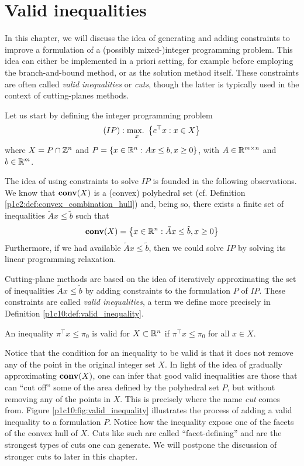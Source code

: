 \section{Valid inequalities}

In this chapter, we will discuss the idea of generating and adding constraints to improve a formulation of a (possibly mixed-)integer programming problem. This idea can either be implemented in a priori setting, for example before employing the branch-and-bound method, or as the solution method itself. These constraints are often called \emph{valid inequalities} or \emph{cuts}, though the latter is typically used in the context of cutting-planes methods.

Let us start by defining the integer programming problem
%
\begin{equation*}
	(IP) : \mathop{\text{max.~}}_x \left\{ c^\top x : x \in X \right \}
\end{equation*}
%
where $X = P \cap \mathbb{Z}^n$ and $P = \left\{ x \in \mathbb{R}^n : Ax \leq b, x \geq 0 \right \}$, with $A \in \mathbb{R}^{m \times n}$ and $b \in \mathbb{R}^m$. 

The idea of using constraints to solve $IP$ is founded in the following observations. We know that $\mathop{\bf conv}(X)$ is a (convex) polyhedral set (cf. Definition \ref{p1c2:def:convex_combination_hull}) and, being so, there exists a finite set of inequalities $\tilde{A}x \le \tilde{b}$ such that 
%
\begin{equation*}
	\mathop{\bf conv}(X) = \left\{ x \in \mathbb{R}^n: \tilde{A}x \leq \tilde{b}, x \geq 0 \right \}	
\end{equation*}
%
Furthermore, if we had available $\tilde{A}x \le \tilde{b}$, then we could solve $IP$ by solving its linear programming relaxation.

Cutting-plane methods are based on the idea of iteratively approximating the set of inequalities $\tilde{A}x \le \tilde{b}$ by adding constraints to the formulation $P$ of $IP$. These constraints are called \emph{valid inequalities}, a term we define more precisely in Definition \ref{p1c10:def:valid_inequality}.

\begin{definition} \label{p1c10:def:valid_inequality}
	An inequality $\pi^\top  x \leq \pi_0$ is valid for $X \subset \mathbb{R}^n$ if $\pi^\top  x \leq \pi_0$ for all $x \in X$.
\end{definition}

Notice that the condition for an inequality to be valid is that it does not remove any of the point in the original integer set $X$. In light of the idea of gradually approximating $\mathop{\bf conv}(X)$, one can infer that good valid inequalities are those that can ``cut off'' some of the area defined by the polyhedral set $P$, but without removing any of the points in $X$. This is precisely where the name \emph{cut} comes from. Figure \ref{p1c10:fig:valid_inequality} illustrates the process of adding a valid inequality to a formulation $P$. Notice how the inequality expose one of the facets of the convex hull of $X$. Cuts like such are called ``facet-defining'' and are the strongest types of cuts one can generate. We will postpone the discussion of stronger cuts to later in this chapter.

